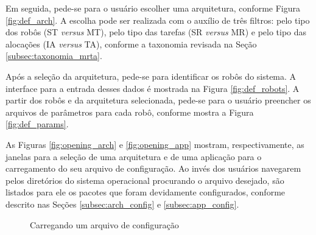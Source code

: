             Em seguida, pede-se para o usuário escolher uma arquitetura, conforme Figura \ref{fig:def_arch}. A escolha pode ser realizada com o auxílio de três filtros: pelo tipo dos robôs (ST \textit{versus} MT), pelo tipo das tarefas (SR \textit{versus} MR) e pelo tipo das alocações (IA \textit{versus} TA), conforme a taxonomia revisada na Seção \ref{subsec:taxonomia_mrta}.
            
            Após a seleção da arquitetura, pede-se para identificar os robôs do sistema. A interface para a entrada desses dados é mostrada na Figura \ref{fig:def_robots}. A partir dos robôs e da arquitetura selecionada, pede-se para o usuário preencher os arquivos de parâmetros para cada robô, conforme mostra a Figura \ref{fig:def_params}.
            
            As Figuras \ref{fig:opening_arch} e \ref{fig:opening_app} mostram, respectivamente, as janelas para a seleção de uma arquitetura e de uma aplicação para o carregamento do seu arquivo de configuração. Ao invés dos usuários navegarem pelos diretórios do sistema operacional procurando o arquivo desejado, são listados para ele os pacotes que foram devidamente configurados, conforme descrito nas Seções \ref{subsec:arch_config} e \ref{subsec:app_config}.
            
            \begin{figure}[htb]
                \centering
                \caption{Carregando um arquivo de configuração} \label{fig:opening_config}
            \end{figure}
        
